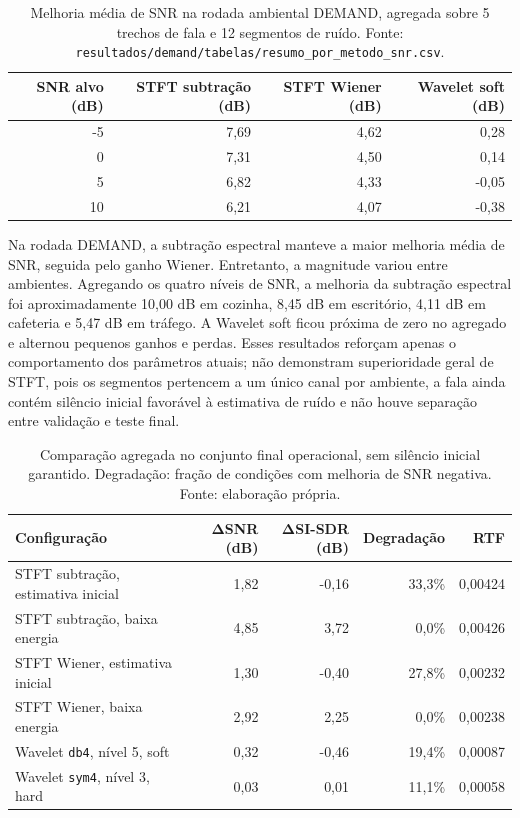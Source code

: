 \begin{table}[!htbp]
\centering
\caption[Melhoria média de SNR com ruídos DEMAND]{Melhoria média de SNR na rodada ambiental DEMAND, agregada sobre 5 trechos de fala e 12 segmentos de ruído. Fonte: \texttt{resultados/demand/tabelas/resumo\_por\_metodo\_snr.csv}.}
\label{tab:resultados-demand}
\small
\begin{tabular}{rrrr}
\toprule
\textbf{SNR alvo (dB)} & \textbf{STFT subtração (dB)} & \textbf{STFT Wiener (dB)} & \textbf{Wavelet soft (dB)} \\
\midrule
-5 & 7,69 & 4,62 & 0,28 \\
0 & 7,31 & 4,50 & 0,14 \\
5 & 6,82 & 4,33 & -0,05 \\
10 & 6,21 & 4,07 & -0,38 \\
\bottomrule
\end{tabular}
\end{table}
\FloatBarrier

Na rodada DEMAND, a subtração espectral manteve a maior melhoria média de SNR, seguida pelo ganho Wiener. Entretanto, a magnitude variou entre ambientes. Agregando os quatro níveis de SNR, a melhoria da subtração espectral foi aproximadamente 10,00 dB em cozinha, 8,45 dB em escritório, 4,11 dB em cafeteria e 5,47 dB em tráfego. A Wavelet soft ficou próxima de zero no agregado e alternou pequenos ganhos e perdas. Esses resultados reforçam apenas o comportamento dos parâmetros atuais; não demonstram superioridade geral de STFT, pois os segmentos pertencem a um único canal por ambiente, a fala ainda contém silêncio inicial favorável à estimativa de ruído e não houve separação entre validação e teste final.

\begin{table}[!htbp]
\centering
\caption[Refinamento no conjunto final operacional]{Comparação agregada no conjunto final operacional, sem silêncio inicial garantido. Degradação: fração de condições com melhoria de SNR negativa. Fonte: elaboração própria.}
\label{tab:resultados-refinamento}
\footnotesize
\begin{tabularx}{\textwidth}{Xrrrr}
\toprule
\textbf{Configuração} & \(\boldsymbol{\Delta}\)\textbf{SNR (dB)} & \(\boldsymbol{\Delta}\)\textbf{SI-SDR (dB)} & \textbf{Degradação} & \textbf{RTF} \\
\midrule
STFT subtração, estimativa inicial & 1,82 & -0,16 & 33,3\% & 0,00424 \\
STFT subtração, baixa energia & 4,85 & 3,72 & 0,0\% & 0,00426 \\
STFT Wiener, estimativa inicial & 1,30 & -0,40 & 27,8\% & 0,00232 \\
STFT Wiener, baixa energia & 2,92 & 2,25 & 0,0\% & 0,00238 \\
Wavelet \texttt{db4}, nível 5, soft & 0,32 & -0,46 & 19,4\% & 0,00087 \\
Wavelet \texttt{sym4}, nível 3, hard & 0,03 & 0,01 & 11,1\% & 0,00058 \\
\bottomrule
\end{tabularx}
\end{table}
\FloatBarrier

